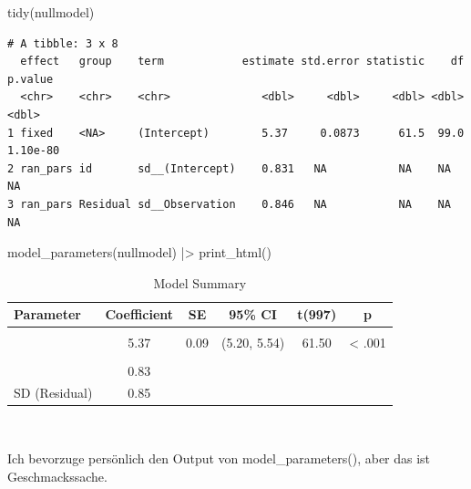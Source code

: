 \documentclass[
  letterpaper,
  DIV=11,
  numbers=noendperiod]{scrreprt}
\newenvironment{Shaded}{\begin{snugshade}}{\end{snugshade}}
\newcommand{\FunctionTok}[1]{\textcolor[rgb]{0.28,0.35,0.67}{#1}}
\newcommand{\NormalTok}[1]{\textcolor[rgb]{0.00,0.23,0.31}{#1}}
\newcommand{\SpecialCharTok}[1]{\textcolor[rgb]{0.37,0.37,0.37}{#1}}
\begin{document}
\begin{Shaded}
\begin{Highlighting}[]
\FunctionTok{tidy}\NormalTok{(nullmodel)}
\end{Highlighting}
\end{Shaded}

\begin{verbatim}
# A tibble: 3 x 8
  effect   group    term            estimate std.error statistic    df   p.value
  <chr>    <chr>    <chr>              <dbl>     <dbl>     <dbl> <dbl>     <dbl>
1 fixed    <NA>     (Intercept)        5.37     0.0873      61.5  99.0  1.10e-80
2 ran_pars id       sd__(Intercept)    0.831   NA           NA    NA   NA       
3 ran_pars Residual sd__Observation    0.846   NA           NA    NA   NA       
\end{verbatim}

\begin{Shaded}
\begin{Highlighting}[]
\FunctionTok{model\_parameters}\NormalTok{(nullmodel) }\SpecialCharTok{|\textgreater{}} \FunctionTok{print\_html}\NormalTok{()}
\end{Highlighting}
\end{Shaded}

\begin{table}
\caption*{
{\large Model Summary}
} 
\fontsize{12.0pt}{14.4pt}\selectfont
\begin{tabular*}{\linewidth}{@{\extracolsep{\fill}}lccccc}
\toprule
Parameter & Coefficient & SE & 95\% CI & t(997) & p \\ 
\midrule\addlinespace[2.5pt]
\multicolumn{6}{l}{{\slshape Fixed Effects }} \\[2.5pt] 
\midrule\addlinespace[2.5pt]
{(Intercept)} & 5.37 & 0.09 & (5.20, 5.54) & 61.50 & < .001 \\ 
\midrule\addlinespace[2.5pt]
\multicolumn{6}{l}{{\slshape Random Effects }} \\[2.5pt] 
\midrule\addlinespace[2.5pt]
{SD (Intercept: id)} & 0.83 &  &  &  &  \\ 
{SD (Residual)} & 0.85 &  &  &  &  \\ 
\bottomrule
\end{tabular*}
\begin{minipage}{\linewidth}
\\
\end{minipage}
\end{table}

Ich bevorzuge persönlich den Output von model\_parameters(), aber das
ist Geschmackssache.
\end{document}
